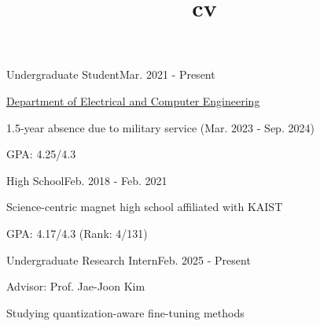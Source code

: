 \documentclass{cv}
\title{cv}
\begin{document}
\cvheader






{Undergraduate Student}{Mar. 2021 - Present}
{
    \item \href{http://ece.snu.ac.kr/en}{Department of Electrical and Computer Engineering}
    \item 1.5-year absence due to military service (Mar. 2023 - Sep. 2024)
    \item GPA: 4.25/4.3
}
{High School}{Feb. 2018 - Feb. 2021}
{
    \item Science-centric magnet high school affiliated with KAIST
    \item GPA: 4.17/4.3 (Rank: 4/131)
}



{Undergraduate Research Intern}{Feb. 2025 - Present}
{
    \item Advisor: Prof. Jae-Joon Kim 
    \item Studying quantization-aware fine-tuning methods
}
\end{document}
